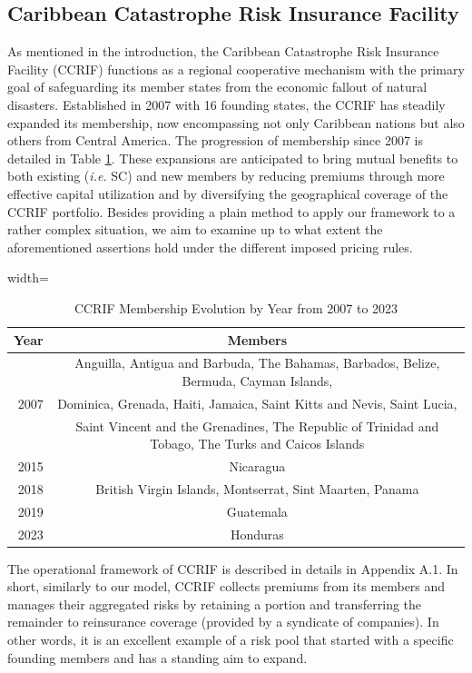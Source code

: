 \documentclass[fleqn,mnsc,nonblindrev]{informs4}
\begin{document}
\subsection{Caribbean Catastrophe Risk Insurance Facility}
As mentioned in the introduction, the Caribbean Catastrophe Risk Insurance Facility (CCRIF) functions as a regional cooperative mechanism with the primary goal of safeguarding its member states from the economic fallout of natural disasters. Established in 2007 with 16 founding states, the CCRIF has steadily expanded its membership, now encompassing not only Caribbean nations but also others from Central America. The progression of membership since 2007 is detailed in Table \ref{tab:evolution}. These expansions are anticipated to bring mutual benefits to both existing (\textit{i.e.} SC) and new members by reducing premiums through more effective capital utilization and by diversifying the geographical coverage of the CCRIF portfolio. Besides providing a plain method to apply our framework to a rather complex situation, we aim to examine up to what extent the aforementioned assertions hold under the different imposed pricing rules. 
\begin{table}[t]
\centering
\caption{CCRIF Membership Evolution by Year from 2007 to 2023}
\begin{adjustbox}{width=\textwidth}
\begin{tabular}{rc}
\toprule\toprule
 Year & Members \\
\midrule
\multirow{3}{*}{2007} & Anguilla, Antigua and Barbuda, The Bahamas, Barbados, Belize, Bermuda, Cayman Islands,\\
&   Dominica, Grenada, Haiti, Jamaica, Saint Kitts and Nevis, Saint Lucia,\\
&Saint Vincent and the Grenadines, The Republic of Trinidad and Tobago, The Turks and Caicos Islands \\
2015 &   Nicaragua \\
2018 &  British Virgin Islands, Montserrat, Sint Maarten, Panama \\
2019 &  Guatemala  \\
2023 & Honduras\\
\bottomrule\bottomrule
\end{tabular}
\end{adjustbox}
\label{tab:evolution}
\end{table}

The operational framework of CCRIF is described in details in Appendix A.1. In short, similarly to our model, CCRIF collects premiums from its members and manages their aggregated risks by retaining a portion and transferring the remainder to reinsurance coverage (provided by a syndicate of companies). In other words, it is an excellent example of a risk pool that started with a specific founding members and has a standing aim to expand.  
\end{document}
